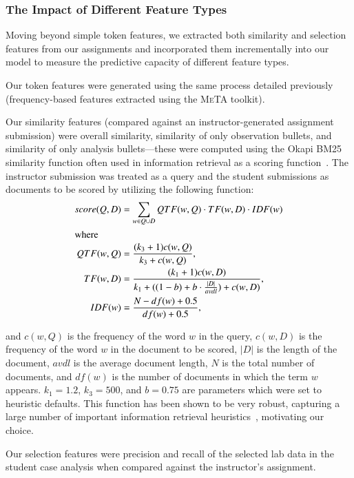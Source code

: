\subsubsection{The Impact of Different Feature Types}
Moving beyond simple token features, we extracted both similarity and
selection features from our assignments and incorporated them
incrementally into our model to measure the predictive capacity of
different feature types.

Our token features were generated using the same process detailed
previously (frequency-based features extracted using the \textsc{MeTA}
toolkit).

Our similarity features (compared against an instructor-generated
assignment submission) were overall similarity, similarity of only
observation bullets, and similarity of only analysis bullets---these were
computed using the Okapi BM25 similarity function often used in information
retrieval as a scoring function~\cite{Robertson:1994:SIGIR,
Robertson:1996:TREC-3}. The instructor submission was treated as a query
and the student submissions as documents to be scored by utilizing the
following function:
\begin{align*}
    score(Q, D) &= \sum_{w \in Q \cup D} QTF(w, Q) \cdot TF(w, D) \cdot
IDF(w)\\
\intertext{where}
    QTF(w, Q) &= \frac{(k_3 + 1)c(w, Q)}{k_3 + c(w, Q)},\\
    TF(w, D) &= \frac{(k_1 + 1)c(w,D)}{k_1 + ((1-b) + b \cdot
\frac{|D|}{avdl}) + c(w,D)},\\
    IDF(w) &= \frac{N - df(w) + 0.5}{df(w) + 0.5},
\end{align*}

and $c(w, Q)$ is the frequency of the word $w$ in the query, $c(w, D)$ is
the frequency of the word $w$ in the document to be scored, $|D|$ is the
length of the document, $avdl$ is the average document length, $N$ is the
total number of documents, and $df(w)$ is the number of documents in which
the term $w$ appears. $k_1 = 1.2$, $k_3 = 500$, and $b = 0.75$ are
parameters which were set to heuristic defaults. This function has been
shown to be very robust, capturing a large number of important information
retrieval heuristics~\cite{Fang:2005:Axiomatic}, motivating our choice.

Our selection features were precision and recall of the
selected lab data in the student case analysis when compared against the
instructor's assignment.

